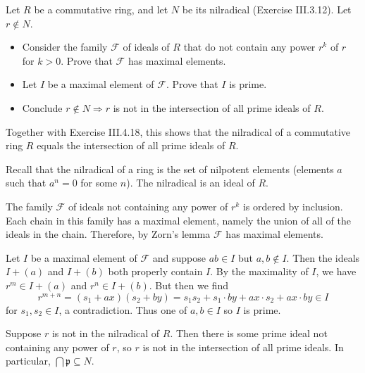 \documentclass[../../master.tex]{subfiles}
\begin{document}
    \begin{problem}
        Let $R$ be a commutative ring, and let $N$ be its nilradical (Exercise
        III.3.12). Let $r \notin N$.
        \begin{itemize}
            \item Consider the family $\mathscr{F}$ of ideals of $R$ that do not
                contain any power $r^{k}$ of $r$ for $k > 0$. Prove that
                $\mathscr{F}$ has maximal elements.
            \item Let $I$ be a maximal element of $\mathscr{F}$. Prove that $I$
                is prime.
            \item Conclude $r \notin N \Longrightarrow r$ is not in the
                intersection of all prime ideals of $R$.
        \end{itemize}
        Together with Exercise III.4.18, this shows that the nilradical of a
        commutative ring $R$ equals the intersection of all prime ideals of $R$.
    \end{problem}

    \begin{solution}
        Recall that the nilradical of a ring is the set of nilpotent elements
        (elements $a$ such that $a^{n}=0$ for some $n$). The nilradical is an
        ideal of $R$. 
        
        The family $\mathscr{F}$ of ideals not containing any power of $r^{k}$
        is ordered by inclusion. Each chain in this family has a maximal
        element, namely the union of all of the ideals in the chain. Therefore,
        by Zorn's lemma $\mathscr{F}$ has maximal elements.

        Let $I$ be a maximal element of $\mathscr{F}$ and suppose $ab \in I$ but
        $a, b \notin I$. Then the ideals $I + (a)$ and $I + (b)$ both properly
        contain $I$. By the maximality of $I$, we have $r^{m} \in I + (a)$ and
        $r^{n} \in I + (b)$. But then we find
        \[
            r^{m + n} = (s_1 + ax) (s_2 + by) = s_1s_2 + s_1 \cdot by + ax \cdot
            s_2 + ax \cdot by \in I
        \] 
        for $s_1, s_2 \in I$, a contradiction. Thus one of $a, b \in I$ so $I$
        is prime.

        Suppose $r$ is not in the nilradical of $R$. Then there is some prime
        ideal not containing any power of $r$, so $r$ is not in the
        intersection of all prime ideals. In particular, $\bigcap \mathfrak{p}
        \subseteq N$.
    \end{solution}
\end{document}
